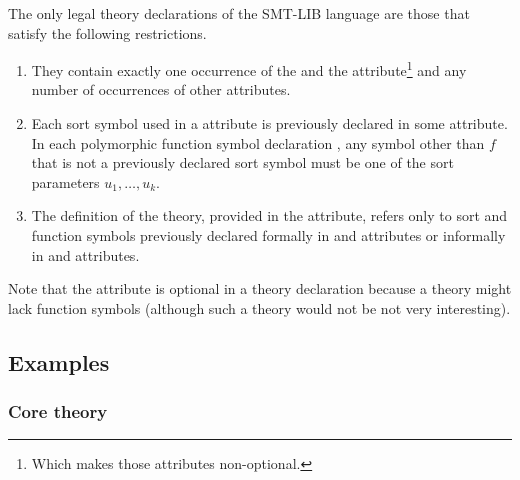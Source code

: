 \begin{constraint}
\label{def:theory}
The only legal theory declarations of the SMT-LIB language are those 
that satisfy the following restrictions.
\begin{enumerate}
\item
They contain exactly one occurrence of the  and 
the  attribute\footnote{%
Which makes those attributes non-optional.
}
and any number of occurrences of other attributes.

\item
Each sort symbol used in a  attribute is 
previously declared in some  attribute.
In each polymorphic function symbol declaration
,
any symbol other than $f$ that is not a previously declared sort symbol
must be one of the sort parameters $u_1, \ldots, u_k$. 

\item
The definition of the theory, provided in the  attribute,
refers only to sort and function symbols previously declared formally
in  and  attributes or 
informally in  and  attributes.

\end{enumerate}
\end{constraint}

Note that the  attribute is optional in a theory declaration
because a theory might lack function symbols (although 
such a theory would not be not very interesting).


\subsection{Examples} \label{sec:theory-examples}

\subsubsection*{Core theory}

